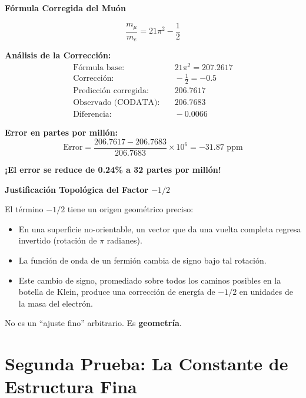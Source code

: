 \begin{nivelmatematico}
\textbf{Fórmula Corregida del Muón}

\begin{equation}
\boxed{\frac{m_\mu}{m_e} = 21\pi^2 - \frac{1}{2}}
\end{equation}

\textbf{Análisis de la Corrección:}
\begin{align}
\text{Fórmula base:} & \quad 21\pi^2 = 207.2617\\
\text{Corrección:} & \quad -\frac{1}{2} = -0.5\\
\text{Predicción corregida:} & \quad 206.7617\\
\text{Observado (CODATA):} & \quad 206.7683\\
\text{Diferencia:} & \quad -0.0066
\end{align}

\textbf{Error en partes por millón:}
\[\text{Error} = \frac{206.7617 - 206.7683}{206.7683} \times 10^6 = -31.87 \text{ ppm}\]

\textbf{¡El error se reduce de 0.24\% a 32 partes por millón!}
\end{nivelmatematico}

\begin{nivelconceptual}
\textbf{Justificación Topológica del Factor $-1/2$}

El término $-1/2$ tiene un origen geométrico preciso:

\begin{itemize}
    \item En una superficie no-orientable, un vector que da una vuelta completa
    regresa invertido (rotación de $\pi$ radianes).

    \item La función de onda de un fermión cambia de signo bajo tal rotación.

    \item Este cambio de signo, promediado sobre todos los caminos posibles
    en la botella de Klein, produce una corrección de energía de $-1/2$
    en unidades de la masa del electrón.
\end{itemize}

No es un ``ajuste fino'' arbitrario. Es \textbf{geometría}.
\end{nivelconceptual}


\section{Segunda Prueba: La Constante de Estructura Fina}

